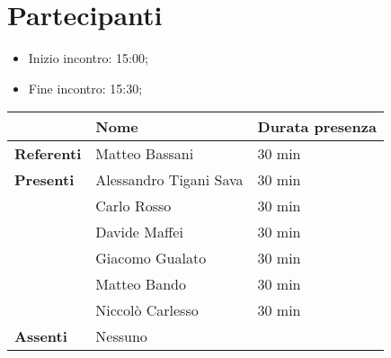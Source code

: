 \section{Partecipanti}

\begin{itemize}
    \item Inizio incontro: 15:00;
    \item Fine incontro: 15:30;
\end{itemize}


\begin{center}
{\renewcommand{\arraystretch}{1.5}
\begin{tabular}{l|ll}
	                    & \textbf{Nome}  & \textbf{Durata presenza} 	\\
	\hline
	\textbf{Referenti} 	& Matteo Bassani 			& 30 min  \\
	
	\hline
	\textbf{Presenti}   & Alessandro Tigani Sava	& 30 min  \\  
						& Carlo Rosso            	& 30 min  \\  
						& Davide Maffei          	& 30 min  \\  
  						& Giacomo Gualato        	& 30 min  \\  
						& Matteo Bando           	& 30 min  \\  
						& Niccolò Carlesso       	& 30 min  \\  
	\hline
	\textbf{Assenti}	& 	     Nessuno    		&	      \\
\end{tabular}	
}
\end{center}